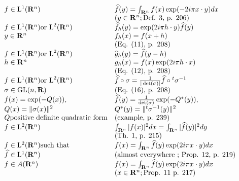 \[
\begin{array}{l l} f \in \mathrm{L} ^ {1} (\mathbf {R} ^ {n}) & \widehat {f} (y) = \int_ {\mathbf {R} ^ {n}} f (x) \exp (- 2 i \pi x \cdot y) d x \\ & (y \in \mathbf {R} ^ {n}; \text {Def. 3, p. 206}) \\ f \in \mathrm{L} ^ {1} (\mathbf {R} ^ {n}) \text {or L} ^ {2} (\mathbf {R} ^ {n}) & \widehat {f} _ {h} (y) = \exp (2 i \pi h \cdot y) \widehat {f} (y) \\ y \in \mathbf {R} ^ {n} & f _ {h} (x) = f (x + h) \\ & (\text {Eq. (11), p. 208}) \\ f \in \mathrm{L} ^ {1} (\mathbf {R} ^ {n}) \text {or L} ^ {2} (\mathbf {R} ^ {n}) & \widehat {g} _ {h} (y) = \widehat {f} (y - h) \\ h \in \mathbf {R} ^ {n} & g _ {h} (x) = f (x) \exp (2 i \pi h \cdot x) \\ & (\text {Eq. (12), p. 208}) \\ f \in \mathrm{L} ^ {1} (\mathbf {R} ^ {n}) \text {or L} ^ {2} (\mathbf {R} ^ {n}) & \widehat {f} \circ \sigma = \frac {1}{| \det (\sigma) |} \widehat {f} \circ {} ^ {t} \sigma^ {- 1} \\ \sigma \in \mathrm{GL} (n, \mathbf {R}) & (\text {Eq. (16), p. 208}) \\ f (x) = \exp (- Q (x)), & \widehat {f} (y) = \frac {1}{\det (\sigma)} \exp (- Q ^ {*} (y)), \\ Q (x) = \| \sigma (x) \| ^ {2} & Q ^ {*} (y) = \| ^ {t} \sigma^ {- 1} (y) \| ^ {2} \\ Q \text {positive definite quadratic form} & (\text {example, p. 239}) \\ f \in \mathrm{L} ^ {2} (\mathbf {R} ^ {n}) & \int_ {\mathbf {R} ^ {n}} | f (x) | ^ {2} d x = \int_ {\mathbf {R} ^ {n}} | \widehat {f} (y) | ^ {2} d y \\ & (\text {Th. 1, p. 215}) \\ f \in \mathrm{L} ^ {2} (\mathbf {R} ^ {n}) \text {such that} & f (x) = \int_ {\mathbf {R} ^ {n}} \widehat {f} (y) \exp (2 i \pi x \cdot y) d x \\ \widehat {f} \in \mathrm{L} ^ {1} (\mathbf {R} ^ {n}) & (\text {almost everywhere ; Prop. 12, p. 219}) \\ f \in A (\mathbf {R} ^ {n}) & f (x) = \int_ {\mathbf {R} ^ {n}} \widehat {f} (y) \exp (2 i \pi x \cdot y) d x \\ & (x \in \mathbf {R} ^ {n}; \text {Prop. 11 p. 217}) \end{array}
\]

